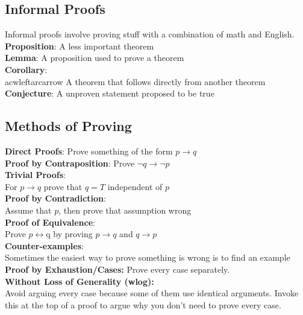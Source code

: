 \documentclass[letter]{article}
\begin{document}
\begin{multicols}{2}

  \section{Informal Proofs}\noindent
  Informal proofs involve proving stuff with a combination of math and English.
  \\
  \textbf{Proposition}: A less important theorem \\
  \textbf{Lemma}: A proposition used to prove a theorem \\
  \textbf{Corollary}:\\acwleftarcarrow A theorem that follows directly from another theorem \\
  \textbf{Conjecture}: A unproven statement proposed to be true \\

  \subsection{Methods of Proving}\noindent
  \textbf{Direct Proofs}: Prove something of the form $p \rightarrow q$ \\
  \textbf{Proof by Contraposition}: Prove $\neg q \rightarrow \neg p$ \\
  \textbf{Trivial Proofs}:\\ For $p \rightarrow q$ prove that $q = T$ independent
  of $p$ \\
  \textbf{Proof by Contradiction}:\\ Assume that $p$, then prove that assumption
  wrong \\
  \textbf{Proof of Equivalence}:\\ Prove $p \leftrightarrow $q by proving
  $p \rightarrow q$ and $q \rightarrow p$ \\
  \textbf{Counter-examples}:\\ Sometimes the easiest way to prove something is
  wrong is to find an example\\
  \textbf{Proof by Exhaustion/Cases:} Prove every case separately.\\
  \textbf{Without Loss of Generality (wlog):}\\ Avoid arguing every case
  because some of them use identical arguments. Invoke this at the top
  of a proof to argue why you don't need to prove every case.


\end{multicols}
\end{document}
